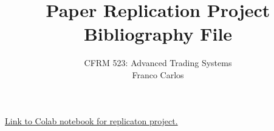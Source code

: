 \documentclass[a4paper,10pt]{article}
\title{Paper Replication Project \\
Bibliography File}
\author{CFRM 523: Advanced Trading Systems\\
Franco Carlos}
\date{}
\begin{document}
\maketitle
\nocite{*}
\medskip
\href{https://colab.research.google.com/drive/1N1vcqHhdMJFkqstDG9mwK6weqi-wb-TT?usp=sharing}{Link to Colab notebook for replicaton project.}


\end{document}
